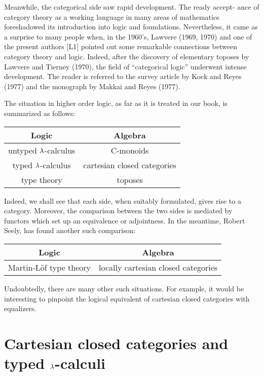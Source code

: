 Meanwhile, the categorical side saw rapid development. The ready accept-
ance of category theory as a working language in many areas of mathematics
foreshadowed its introduction into logic and foundations. Nevertheless, it
came as a surprise to many people when, in the 1960's, Lawvere (1969, 1970) and
one of the present authors [L1] pointed out some remarkable connections between
category theory and logic. Indeed, after the discovery of elementary toposes
by Lawvere and Tierney (1970), the field of ``categorical logic'' underwent
intense development. The reader is referred to the survey article by Kock and
Reyes (1977) and the monograph by Makkai and Reyes (1977).

The situation in higher order logic, as far as it is treated in our book,
is summarized as follows:

\medskip
\renewcommand{\arraystretch}{1.5}

\begin{center}
\begin{tabular}{ c | c }
 \hline
Logic & Algebra \\
 \hline
 untyped $\lambda$-calculus & C-monoids \\
 typed $\lambda$-calculus & cartesian closed categories \\
 type theory & toposes \\
 \hline
\end{tabular}
\end{center}
\medskip

\noindent
Indeed, we shall see that each side, when suitably formulated, gives rise to a
category. Moreover, the comparison between the two sides is mediated by
functors which set up an equivalence or adjointness. In the meantime, Robert
Seely, has found another such comparison:

\begin{center}
\begin{tabular}{ c | c }
 \hline
Logic & Algebra \\
 \hline
Martin-L\"of type theory  & locally cartesian closed categories \\
 \hline
\end{tabular}
\end{center}
\medskip

\noindent
Undoubtedly, there are many other such situations. For example, it would be
interesting to pinpoint the logical equivalent of cartesian closed categories
with equalizers.

\section{Cartesian closed categories and typed $\lambda$-calculi}

